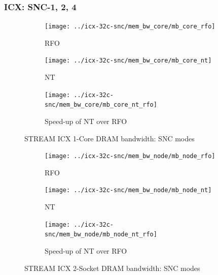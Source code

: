 \documentclass{article}
\begin{document}
\subsubsection{ICX: SNC-1, 2, 4}

\begin{figure}[!hb]
    \centering
    \begin{subfigure}[!hb]{0.3\textwidth}
         \centering
         \texttt{[image: ../icx-32c-snc/mem\_bw\_core/mb\_core\_rfo]}
         \caption{RFO}
         \label{figure:mem_bw_core_rfo_icx_snc}
    \end{subfigure}
    \begin{subfigure}[!hb]{0.3\textwidth}
         \centering
         \texttt{[image: ../icx-32c-snc/mem\_bw\_core/mb\_core\_nt]}
         \caption{NT}
         \label{figure:mem_bw_core_nt_icx_snc}
    \end{subfigure}
    \begin{subfigure}[!hb]{0.3\textwidth}
         \centering
         \texttt{[image: ../icx-32c-snc/mem\_bw\_core/mb\_core\_nt\_rfo]}
         \caption{Speed-up of NT over RFO}
         \label{figure:mem_bw_core_nt_rfo_icx_snc}
    \end{subfigure}

    \caption{STREAM ICX 1-Core DRAM bandwidth: SNC modes}
    \label{figure:mem_bw_core_icx_snc}
\end{figure}

\begin{figure}[!hb]
    \centering
    \begin{subfigure}[!hb]{0.3\textwidth}
         \centering
         \texttt{[image: ../icx-32c-snc/mem\_bw\_node/mb\_node\_rfo]}
         \caption{RFO}
         \label{figure:mem_bw_node_rfo_icx_snc}
    \end{subfigure}
    \begin{subfigure}[!hb]{0.3\textwidth}
         \centering
         \texttt{[image: ../icx-32c-snc/mem\_bw\_node/mb\_node\_nt]}
         \caption{NT}
         \label{figure:mem_bw_node_nt_icx_snc}
    \end{subfigure}
    \begin{subfigure}[!hb]{0.3\textwidth}
         \centering
         \texttt{[image: ../icx-32c-snc/mem\_bw\_node/mb\_node\_nt\_rfo]}
         \caption{Speed-up of NT over RFO}
         \label{figure:mem_bw_node_nt_rfo_icx_snc}
    \end{subfigure}

    \caption{STREAM ICX 2-Socket DRAM bandwidth: SNC modes}
    \label{figure:mem_bw_node_icx_snc}
\end{figure}
\end{document}
